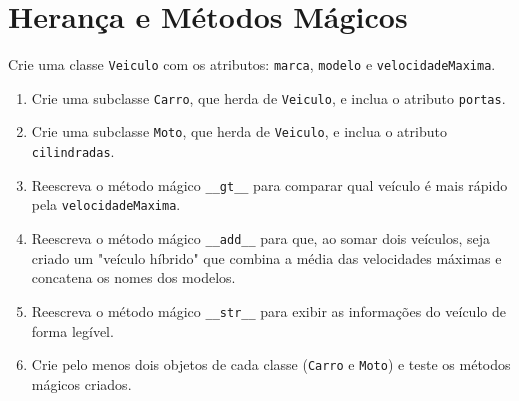 \documentclass{article}
\begin{document}
\section{Herança e Métodos Mágicos}

Crie uma classe \texttt{Veiculo} com os atributos: \texttt{marca}, \texttt{modelo} e \texttt{velocidadeMaxima}.

\begin{enumerate}
    \item Crie uma subclasse \texttt{Carro}, que herda de \texttt{Veiculo}, e inclua o atributo \texttt{portas}.
    \item Crie uma subclasse \texttt{Moto}, que herda de \texttt{Veiculo}, e inclua o atributo \texttt{cilindradas}.
    \item Reescreva o método mágico \texttt{\_\_gt\_\_} para comparar qual veículo é mais rápido pela \texttt{velocidadeMaxima}.
    \item Reescreva o método mágico \texttt{\_\_add\_\_} para que, ao somar dois veículos, seja criado um "veículo híbrido" que combina a média das velocidades máximas e concatena os nomes dos modelos.
    \item Reescreva o método mágico \texttt{\_\_str\_\_} para exibir as informações do veículo de forma legível.
    \item Crie pelo menos dois objetos de cada classe (\texttt{Carro} e \texttt{Moto}) e teste os métodos mágicos criados.
\end{enumerate}
\end{document}

